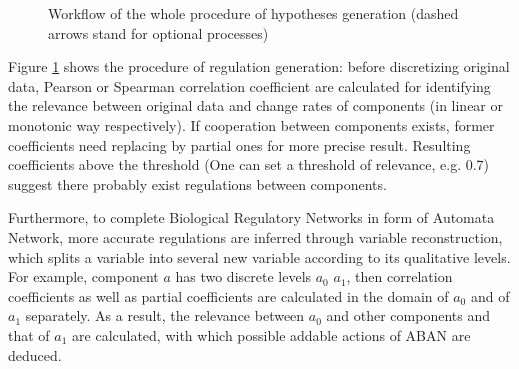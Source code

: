 \begin{figure}[ht]
\centering
{}
\caption[Workflow of model inference via partial correlation]{Workflow of the whole procedure of hypotheses generation (dashed arrows stand for optional processes)}\label{plan}
\end{figure}
Figure \ref{plan} shows the procedure of regulation generation: before discretizing original data, Pearson or Spearman correlation coefficient \cite{samaga2009logic,hauke2011comparison} are calculated for identifying the relevance between original data and change rates of components (in linear or monotonic way respectively). If cooperation between components exists, former coefficients need replacing by partial ones \cite{de2004discovery} for more precise result.
Resulting coefficients above the threshold (One can set a threshold of relevance, e.g. 0.7) suggest there probably exist regulations between components.

Furthermore, to complete Biological Regulatory Networks in form of Automata Network, more accurate regulations are inferred through variable reconstruction, which splits a variable into several new variable according to its qualitative levels.
For example, component $a$ has two discrete levels $a_0$ $a_1$, then correlation coefficients as well as partial coefficients are calculated in the domain of $a_0$ and of $a_1$ separately.
As a result, the relevance between $a_0$ and other components and that of $a_1$ are calculated, with which possible addable actions of ABAN are deduced.

